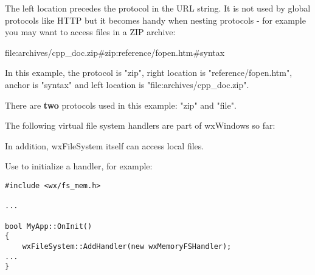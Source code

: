 
The left location precedes the protocol in the URL string. 
It is not used by global protocols like HTTP but it becomes handy when nesting
protocols - for example you may want to access files in a ZIP archive:

file:archives/cpp\_doc.zip\#zip:reference/fopen.htm\#syntax

In this example, the protocol is "zip", right location is
"reference/fopen.htm", anchor is "syntax" and left location
is "file:archives/cpp\_doc.zip". 

There are {\bf two} protocols used in this example: "zip" and "file".


The following virtual file system handlers are part of wxWindows so far:

\begin{twocollist}
\end{twocollist}

In addition, wxFileSystem itself can access local files.



Use  to initialize
a handler, for example:

\begin{verbatim}
#include <wx/fs_mem.h>

...

bool MyApp::OnInit()
{
    wxFileSystem::AddHandler(new wxMemoryFSHandler);
...
}
\end{verbatim}

